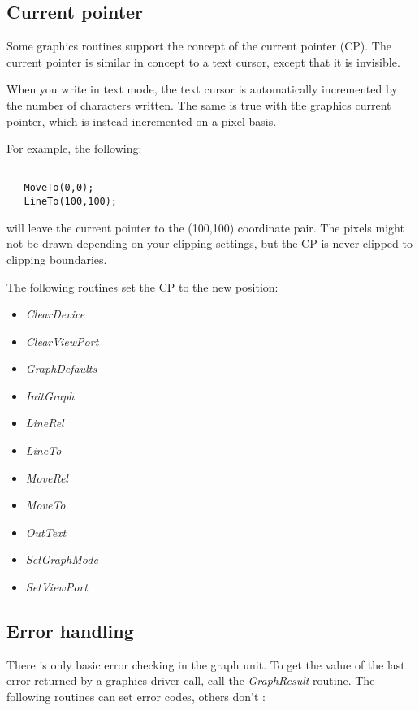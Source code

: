 \subsection{Current pointer}
Some graphics routines support the concept of the current pointer (CP). The
current pointer is similar in concept to a text cursor, except that it is
invisible.

When you write in text mode, the text cursor is automatically incremented
by the number of characters written. The same is true with the graphics
current pointer, which is instead incremented on a pixel basis.

For example, the following:
\begin{verbatim}

   MoveTo(0,0);
   LineTo(100,100);

\end{verbatim}

will leave the current pointer to the (100,100) coordinate pair. The
pixels might not be drawn depending on your clipping settings, but the
CP is never clipped to clipping boundaries.

The following routines set the CP to the new position:

\begin{itemize}
\item \textit{ClearDevice}
\item \textit{ClearViewPort}
\item \textit{GraphDefaults}
\item \textit{InitGraph}
\item \textit{LineRel}
\item \textit{LineTo}
\item \textit{MoveRel}
\item \textit{MoveTo}
\item \textit{OutText}
\item \textit{SetGraphMode}
\item \textit{SetViewPort}
\end{itemize}

\subsection{Error handling}

There is only basic error checking in the graph unit. To get the value of
the last error returned by a graphics driver call, call the
\textit{GraphResult} routine. The following routines can set error codes,
others don't :

